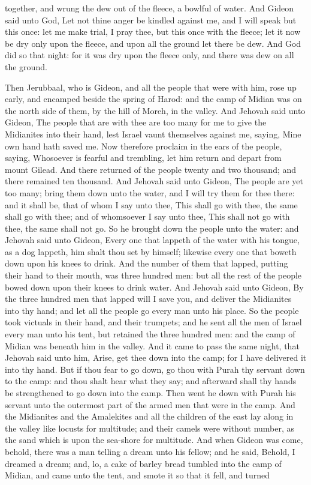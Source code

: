 together, and wrung the dew out of the fleece, a bowlful of water. And Gideon said unto God, Let not thine anger be kindled against me, and I will speak but this once: let me make trial, I pray thee, but this once with the fleece; let it now be dry only upon the fleece, and upon all the ground let there be dew. And God did so that night: for it was dry upon the fleece only, and there was dew on all the ground. 

Then Jerubbaal, who is Gideon, and all the people that were with him, rose up early, and encamped beside the spring of Harod: and the camp of Midian was on the north side of them, by the hill of Moreh, in the valley.  And Jehovah said unto Gideon, The people that are with thee are too many for me to give the Midianites into their hand, lest Israel vaunt themselves against me, saying, Mine own hand hath saved me. Now therefore proclaim in the ears of the people, saying, Whosoever is fearful and trembling, let him return and depart from mount Gilead. And there returned of the people twenty and two thousand; and there remained ten thousand.  And Jehovah said unto Gideon, The people are yet too many; bring them down unto the water, and I will try them for thee there: and it shall be, that of whom I say unto thee, This shall go with thee, the same shall go with thee; and of whomsoever I say unto thee, This shall not go with thee, the same shall not go. So he brought down the people unto the water: and Jehovah said unto Gideon, Every one that lappeth of the water with his tongue, as a dog lappeth, him shalt thou set by himself; likewise every one that boweth down upon his knees to drink. And the number of them that lapped, putting their hand to their mouth, was three hundred men: but all the rest of the people bowed down upon their knees to drink water. And Jehovah said unto Gideon, By the three hundred men that lapped will I save you, and deliver the Midianites into thy hand; and let all the people go every man unto his place. So the people took victuals in their hand, and their trumpets; and he sent all the men of Israel every man unto his tent, but retained the three hundred men: and the camp of Midian was beneath him in the valley.  And it came to pass the same night, that Jehovah said unto him, Arise, get thee down into the camp; for I have delivered it into thy hand. But if thou fear to go down, go thou with Purah thy servant down to the camp: and thou shalt hear what they say; and afterward shall thy hands be strengthened to go down into the camp. Then went he down with Purah his servant unto the outermost part of the armed men that were in the camp. And the Midianites and the Amalekites and all the children of the east lay along in the valley like locusts for multitude; and their camels were without number, as the sand which is upon the sea-shore for multitude. And when Gideon was come, behold, there was a man telling a dream unto his fellow; and he said, Behold, I dreamed a dream; and, lo, a cake of barley bread tumbled into the camp of Midian, and came unto the tent, and smote it so that it fell, and turned 